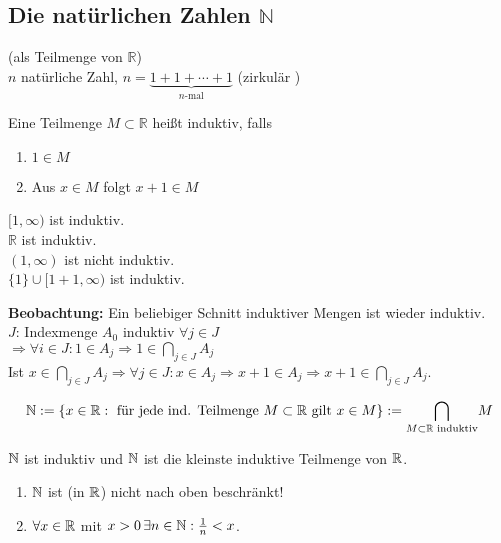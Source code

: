 \documentclass[../ana1.tex]{subfiles}
\begin{document}
\subsection{Die natürlichen Zahlen \( \mathbb{N}\)}
(als Teilmenge von \( \mathbb{R}\))\\
\(n\) natürliche Zahl, \(n=\underbrace{1+1+\cdots + 1}_{n\text{-mal}}\) (zirkulär \Lightning)
\begin{defi}
	Eine Teilmenge \(M\subset \mathbb{R}\) heißt induktiv, falls
	\begin{enumerate}
		\item \(1\in M\)
		\item Aus \(x\in M\) folgt \(x+1 \in M\)
	\end{enumerate}
\end{defi}
\begin{bsp}
	\([1,\infty)\) ist induktiv.\\
	\( \mathbb{R}\) ist induktiv.\\
	\((1,\infty)\) ist nicht induktiv.\\
	\( \{1\} \cup [1+1,\infty)\) ist induktiv.
\end{bsp}
\textbf{Beobachtung:} Ein beliebiger Schnitt induktiver Mengen ist wieder induktiv.\\
\(J\): Indexmenge \(A_0\) induktiv \( \forall j\in J\) \\
\( \Rightarrow \forall i\in J: 1\in A_j \Rightarrow 1\in \underset{j\in J}{\bigcap} A_j\) \\
Ist \(x\in \underset{j\in J}{\bigcap} A_j\Rightarrow \forall j \in J: x\in A_j \Rightarrow x+1 \in A_j \Rightarrow x+1 \in \underset{j\in J}{\bigcap} A_j\).
\begin{defi}
	\[\mathbb{N} := \{x\in \mathbb{R}: \text{ für jede ind. Teilmenge } M\subset\mathbb{R} \text{ gilt } x\in M\} := \underset{M\subset \mathbb{R}\text{ induktiv}}{\bigcap} M\]
\end{defi}
\begin{bem}
	\( \mathbb{N} \) ist induktiv und \( \mathbb{N} \) ist die kleinste induktive Teilmenge von \( \mathbb{R} \).
\end{bem}
\begin{satz}\leavevmode
	\begin{enumerate}
		\item \( \mathbb{N} \) ist (in \( \mathbb{R} \)) nicht nach oben beschränkt!
		\item \(\forall x\in\mathbb{R} \) mit \(x>0 \,\exists n\in \mathbb{N}: \frac{1}{n} < x\).
	\end{enumerate}
\end{satz}
\end{document}
